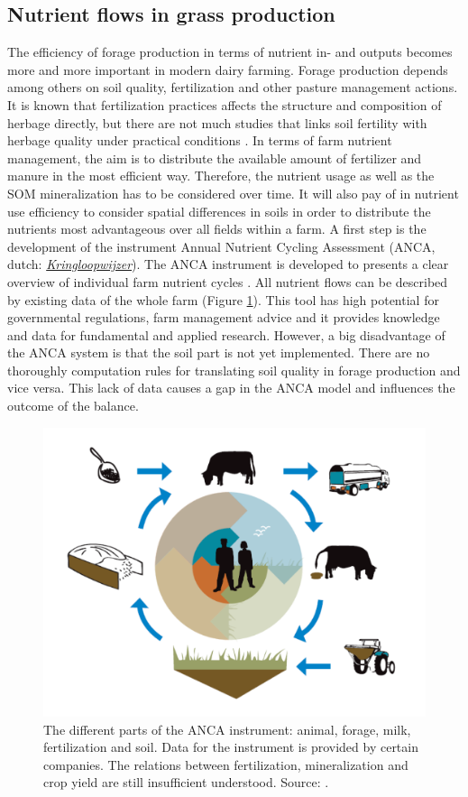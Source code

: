 \documentclass[10pt,twoside,dutch,english]{report}
\begin{document}
			
		\subsection{Nutrient flows in grass production}
		The efficiency of forage production in terms of nutrient in- and outputs becomes more and more important in modern dairy farming. Forage production depends among others on soil quality, fertilization and other pasture management actions. It is known that fertilization practices affects the structure and composition of herbage directly, but there are not much studies that links soil fertility with herbage quality under practical conditions \citep{Reijneveld2014}. In terms of farm nutrient management, the aim is to distribute the available amount of fertilizer and manure in the most efficient way. Therefore, the nutrient usage as well as the SOM mineralization has to be considered over time. It will also pay of in nutrient use efficiency to consider spatial differences in soils in order to distribute the nutrients most advantageous over all fields within a farm.  A first step is the development of the instrument Annual Nutrient Cycling Assessment (ANCA, dutch: 	\href{http://www.wageningenur.nl/nl/show/KringloopWijzer-2.htm}{\textit{Kringloopwijzer}}). The ANCA instrument is developed to presents a clear overview of individual farm nutrient cycles \citep{Aarts2013}. All nutrient flows can be described by existing data of the whole farm (Figure \ref{fig:KLW}). This tool has high potential for governmental regulations, farm management advice and it provides knowledge and data for fundamental and applied research. However, a big disadvantage of the ANCA system is that the soil part is not yet implemented. There are no thoroughly computation rules for translating soil quality in forage production and vice versa. This lack of data causes a gap in the ANCA model and influences the outcome of the balance. 
		
		\begin{figure}[ht]
			\centering
			\includegraphics[width=0.6\linewidth]{intro_KLW}
			\caption{The different parts of the ANCA instrument: animal, forage, milk, fertilization and soil. Data for the instrument is provided by certain companies. The relations between fertilization, mineralization and crop yield are still insufficient understood. Source: \citet{Holster2013}. }
			\label{fig:KLW}
		\end{figure}
		
\end{document}
